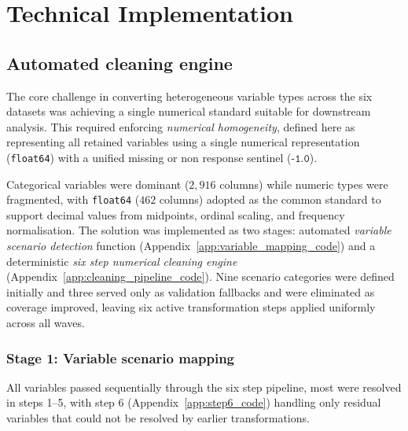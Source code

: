 
\chapter{Technical Implementation}\label{ch:chapter4} %



\ifpdf
    \graphicspath{{4_chapter4/figures/PNG/}{4_chapter4/figures/PDF/}{4_chapter4/figures/}}
\else
    \graphicspath{{4_chapter4/figures/EPS/}{4_chapter4/figures/}}
\fi


\section{Automated cleaning engine}\label{sc:cleaning_engine}
The core challenge in converting heterogeneous variable types across the six datasets was achieving a single numerical standard suitable for downstream analysis. This required enforcing \emph{numerical homogeneity}, defined here as representing all retained variables using a single numerical representation (\texttt{float64}) with a unified missing or non response sentinel ($\texttt{-1.0}$). 

Categorical variables were dominant ($2{,}916$ columns) while numeric types were fragmented, with \texttt{float64} ($462$ columns) adopted as the common standard to support decimal values from midpoints, ordinal scaling, and frequency normalisation. The solution was implemented as two stages: automated \emph{variable scenario detection} function (Appendix~\ref{app:variable_mapping_code}) and a deterministic \emph{six step numerical cleaning engine} (Appendix~\ref{app:cleaning_pipeline_code}). Nine scenario categories were defined initially and three served only as validation fallbacks and were eliminated as coverage improved, leaving six active transformation steps applied uniformly across all waves.

\subsection{Stage 1: Variable scenario mapping}
All variables passed sequentially through the six step pipeline, most were resolved in steps 1--5, with step 6 (Appendix~\ref{app:step6_code}) handling only residual variables that could not be resolved by earlier transformations.

